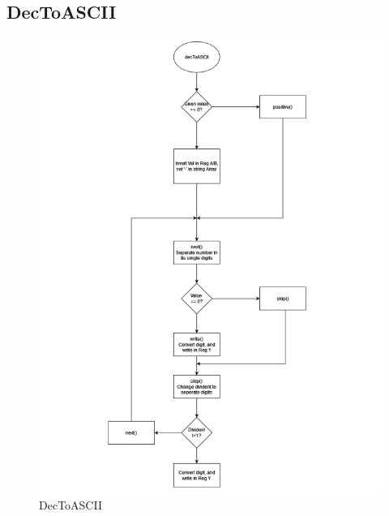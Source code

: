 \documentclass[a4paper,12pt]{article}
\begin{document}
\subsection{DecToASCII}
\begin{figure}[H]
    \centering
    \includegraphics[width=1\textwidth]{diagrams/decToASCII.png}
    \caption{DecToASCII}
    \label{fig:MainDecToASCII}
\end{figure}
\end{document}
